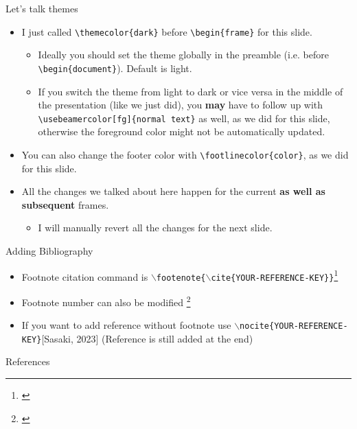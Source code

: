 \documentclass{beamer}
\begin{document}
\begin{frame}[fragile]{Let's talk themes}
\begin{itemize}
\item I just called \verb|\themecolor{dark}| before \verb|\begin{frame}| for this slide.
\begin{itemize}
    \item Ideally you should set the theme globally in the preamble (i.e. before \verb|\begin{document}|). Default is light.
    \item If you switch the theme from light to dark or vice versa in the middle of the presentation (like we just did), you \textbf{may} have to follow up with \verb|\usebeamercolor[fg]{normal text}| as well, as we did for this slide, otherwise the foreground color might not be automatically updated.
\end{itemize}
\item You can also change the footer color with \verb|\footlinecolor{color}|, as we did for this slide.
\item All the changes we talked about here happen for the current \textbf{as well as subsequent} frames.
\begin{itemize}
    \item I will manually revert all the changes for the next slide.
\end{itemize}
\end{itemize}
\end{frame}


\begin{frame}{Adding Bibliography}

    \begin{itemize}
        \item Footnote citation command is \texttt{$\backslash$footenote\{$\backslash$cite\{YOUR-REFERENCE-KEY\}\}}\footnote[1]{\cite{Sasaki.Lightsey.2022}}
        \item Footnote number can also be modified \footnote[3]{\cite{Sasaki.Lightsey.2022}}
        \item If you want to add reference without footnote use \texttt{$\backslash$nocite\{YOUR-REFERENCE-KEY\}}[Sasaki, 2023]\nocite{Sasaki.Lightsey.2023} (Reference is still added at the end)
    \end{itemize}
\end{frame}

\begin{frame}{References}
    \AtNextBibliography{\footnotesize}
    {
    \printbibliography[heading=none]
    }
\end{frame}
\end{document}
